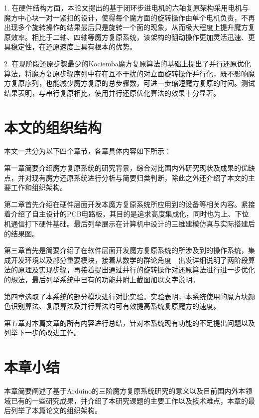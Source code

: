 1.	在硬件结构方面，本论文提出的基于闭环步进电机的六轴复原架构采用电机与魔方中心块一对一紧扣的设计，使得每个魔方面的旋转操作由单个电机负责，不再出现多个旋转操作的结果最后只是旋转一个面的现象，从而极大程度上提升魔方复原效率。相比于二轴、四轴等魔方复原系统，该架构的翻动操作更加灵活迅速、更具稳定性，在还原速度上具有根本的优势。

2.	在现阶段还原步骤最少的Kociemba魔方复原算法的基础上提出了并行还原优化算法，将魔方复原步骤序列中存在互不干扰的对立面旋转操作并行化，既不影响魔方复原序列，也能减少魔方复原的总步骤数，可进一步缩短魔方复原的时间。测试结果表明，与串行复原相比，使用并行还原优化算法的效果十分显著。

\section{本文的组织结构}

本文一共分为以下四个章节，各章具体内容如下所示：

第一章简要介绍魔方复原系统的研究背景，综合对比国内外研究现状及成果的优缺点，并对现有魔方还原系统进行分析与简要归类判断，除此之外还介绍了本文的主要工作和组织架构。

第二章首先介绍在硬件层面开发本魔方复原系统所应用到的设备等相关内容。紧接着介绍了自主设计的PCB电路板，其目的是追求高度集成化，同时也为上、下位机通信打下硬件基础。最后列举展示在计算机中设计的三维建模仿真与实际搭建后的结果图。

第三章首先是简要介绍了在软件层面开发魔方复原系统的所涉及到的操作系统，集成开发环境以及部分重要模块，接着从数学的群论角度~\cite{24}~\cite{25}出发详细说明了两阶段算法的原理及实现步骤，再接着提出通过并行的旋转操作对还原算法进行进一步优化的想法，最后列举系统中已有的功能并附上截图加以文字说明。

第四章选取了本系统的部分模块进行对比实验。实验表明，本系统使用的魔方块颜色识别算法、复原算法及并行算法均可有效提高系统复原魔方的速度。

第五章对本篇文章的所有内容进行总结，针对本系统现有功能的不足提出问题以及列举下一步的改进工作。

\section{本章小结}

本章简要阐述了基于Arduino的三阶魔方复原系统研究的意义以及目前国内外本领域已有的一些研究成果，并介绍了本研究课题的主要工作以及技术难点，本章的最后列举了本篇论文的组织架构。